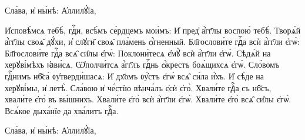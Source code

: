 \hKv Сла́ва, и҆ ны́нѣ: А҆ллилꙋ́їа,  



%


\cuLettrine
И҆сповѣ́мсѧ тебѣ̀, гдⷭ҇и, всѣ́мъ се́рдцемъ мои́мъ:  
\hKv И҆ пред̾ а҆́гг҃лы воспою̀ тебѣ̀. 
\hKv Творѧ́й  а҆́гг҃лы своѧ̑ дꙋ́хи, и҆ слꙋги̑ своѧ̑ пла́мень ѻ҆́гненный.  
\hKv Бл҃гослови́те гдⷭ҇а всѝ а҆́гг҃ли є҆гѡ̀: 
\hKv  Бл҃гослови́те гдⷭ҇а всѧ̑ си̑лы є҆гѡ̀: 
\hKv Поклони́тесѧ  є҆мꙋ̀ всѝ а҆́гг҃ли є҆гѡ̀. 
\hKv Сѣдѧ́й на херꙋві́мѣхъ  ꙗ҆ви́сѧ. 
\hKv Ѡ҆полчи́тсѧ а҆́гг҃лъ гдⷭ҇нь ѻ҆́крестъ  боѧ́щихсѧ є҆гѡ̀. 
\hKv Сло́вомъ гдⷭ҇нимъ нб҃са̀  ᲂу҆тверди́шасѧ: 
\hKv И҆ дх҃омъ ᲂу҆́стъ є҆гѡ̀ всѧ̑ си́ла  и҆́хъ. 
\hKv И҆ сѣ́де на херꙋві́мы, и҆ летѣ̀. 
\hKv Сла́вою  и҆ че́стїю вѣнча́лъ є҆сѝ є҆го̀. 
\hKv Хвали́те гдⷭ҇а съ  нб҃съ, хвали́те є҆го̀ въ вы́шнихъ. 
\hKv Хвали́те є҆го̀  всѝ а҆́гг҃ли є҆гѡ̀. 
\hKv Хвали́те є҆го̀ всѧ̑ си̑лы  є҆гѡ̀. 
\hKv Всѧ́кое дыха́нїе да хва́литъ гдⷭ҇а. 

\hKv Сла́ва, и҆ ны́нѣ: А҆ллилꙋ́їа,   
